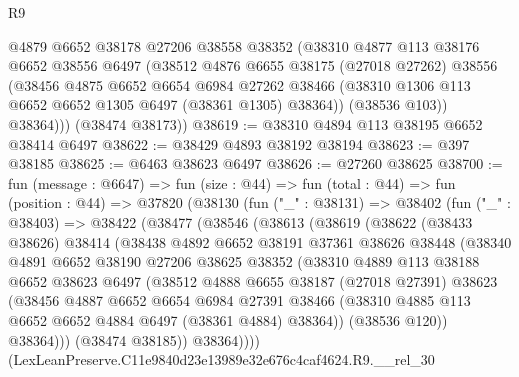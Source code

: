 \begin{lexlean}{R9}
\begin{coremodule}
          @4879
          @6652
          @38178
          @27206
          @38558
          @38352
          (@38310
            @4877
            @113
            @38176
            @6652
            @38556
            @6497
            (@38512
              @4876
              @6655
              @38175
              (@27018 @27262)
              @38556
              (@38456
                @4875
                @6652
                @6654
                @6984
                @27262
                @38466
                (@38310 @1306 @113 @6652 @6652 @1305 @6497 (@38361 @1305) @38364))
              (@38536 @103))
            @38364)))
      (@38474 @38173))
@38619 := @38310 @4894 @113 @38195 @6652 @38414 @6497
@38622 := @38429 @4893 @38192 @38194
@38623 := @397 @38185
@38625 := @6463 @38623 @6497
@38626 := @27260 @38625
@38700 := fun (message : @6647) =>
  fun (size : @44) =>
  fun (total : @44) =>
  fun (position : @44) =>
  @37820
    (@38130
      (fun ("_" : @38131) =>
      @38402
        (fun ("_" : @38403) =>
        @38422
          (@38477
            (@38546
              (@38613
                (@38619
                  (@38622
                    (@38433 @38626)
                    @38414
                    (@38438
                      @4892
                      @6652
                      @38191
                      @37361
                      @38626
                      @38448
                      (@38340
                        @4891
                        @6652
                        @38190
                        @27206
                        @38625
                        @38352
                        (@38310
                          @4889
                          @113
                          @38188
                          @6652
                          @38623
                          @6497
                          (@38512
                            @4888
                            @6655
                            @38187
                            (@27018 @27391)
                            @38623
                            (@38456
                              @4887
                              @6652
                              @6654
                              @6984
                              @27391
                              @38466
                              (@38310 @4885 @113 @6652 @6652 @4884 @6497 (@38361 @4884) @38364))
                            (@38536 @120))
                          @38364)))
                    (@38474 @38185))
                  @38364))))
          (LexLeanPreserve.C11e9840d23e13989e32e676c4caf4624.R9.__rel_30

\end{coremodule}
\end{lexlean}
